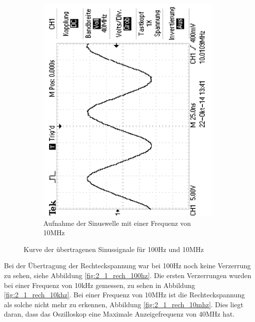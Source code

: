 \documentclass[12pt,a4paper]{article}
\begin{document}
\begin{figure}[H]
\begin{subfigure}[b]{0.48\textwidth}
                \includegraphics[width=\textwidth , scale = 0.4, angle = -90]{2_1_sin_10mhz.pdf}
                \caption[Aufnahme der Sinuswelle mit einer Frequenz von 10MHz]{Aufnahme der Sinuswelle mit einer Frequenz von 10MHz}
  				\label{fig:2_1_sin_10mhz}
        \end{subfigure}
        \caption{Kurve der übertragenen Sinussignale für 100Hz und 10MHz}
        \label{fig:2_1_sin_vergleich}
\end{figure}
\newpage 
Bei der Übertragung der Rechteckspannung war bei 100Hz noch keine Verzerrung zu sehen, siehe Abbildung \ref{fig:2_1_rech_100hz}. Die ersten Verzerrungen wurden bei einer Frequenz von 10kHz gemessen, zu sehen in Abbildung \ref{fig:2_1_rech_10khz}. Bei einer Frequenz von 10MHz ist die Rechteckspannung als solche nicht mehr zu erkennen, Abbildung \ref{fig:2_1_rech_10mhz}. Dies liegt daran, dass das Oszilloskop eine Maximale Anzeigefrequenz von 40MHz hat.
\end{document}
